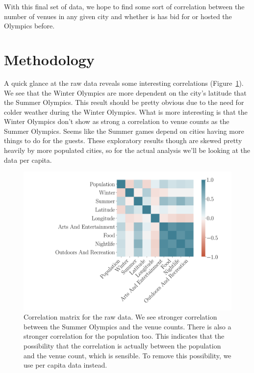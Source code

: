 \documentclass[
 reprint,
 amsmath,amssymb,
 aps,
prb,
floatfix
]{revtex4-2}
\begin{document}
    With this final set of data, we hope to find some sort of correlation between the number of venues in any given city and whether is has bid for or hosted the Olympics before.

\section{Methodology}
    A quick glance at the raw data reveals some interesting correlations (Figure~\ref{raw_corr}). We see that the Winter Olympics are more dependent on the city's latitude that the Summer Olympics. This result should be pretty obvious due to the need for colder weather during the Winter Olympics. What is more interesting is that the Winter Olympics don't show as strong a correlation to venue counts as the Summer Olympics. Seems like the Summer games depend on cities having more things to do for the guests. These exploratory results though are skewed pretty heavily by more populated cities, so for the actual analysis we'll be looking at the data per capita.
    \begin{figure}[htb]
        \centering
        \includegraphics[width=\columnwidth]{../figures/correlation.png}
        \caption{Correlation matrix for the raw data. We see stronger correlation between the Summer Olympics and the venue counts. There is also a stronger correlation for the population too. This indicates that the possibility that the correlation is actually between the population and the venue count, which is sensible. To remove this possibility, we use per capita data instead.}
        \label{raw_corr}
    \end{figure}
\end{document}
